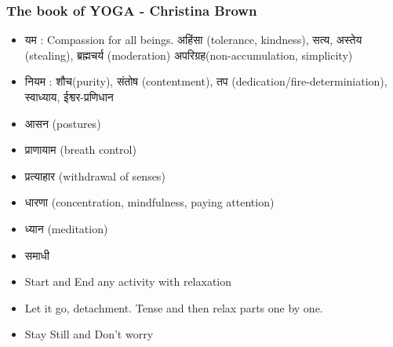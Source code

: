 \begin{frame}[fragile]\frametitle{The book of YOGA - Christina Brown}

	\begin{itemize}
	\item \textmarathi{यम }: Compassion for all beings. \textmarathi{अहिंसा }(tolerance, kindness), \textmarathi{सत्य, अस्तेय} (stealing), \textmarathi{ब्रह्मचर्य} (moderation) \textmarathi{अपरिग्रह}(non-accumulation, simplicity)
	\item \textmarathi{नियम : शौच}(purity), \textmarathi{संतोष} (contentment), तप (dedication/fire-determiniation), \textmarathi{स्वाध्याय, ईश्वर-प्रणिधान}
	\item \textmarathi{आसन}  (postures)
	\item \textmarathi{प्राणायाम }(breath control)
	\item  \textmarathi{प्रत्याहार} (withdrawal of senses)
	\item \textmarathi{धारणा} (concentration, mindfulness, paying attention)
	\item \textmarathi{ध्यान} (meditation)
	\item \textmarathi{समाधी}
	\item Start and End any activity with relaxation
	\item Let it go, detachment. Tense and then relax parts one by one.
	\item Stay Still and Don't worry
	\end{itemize}

\end{frame}


